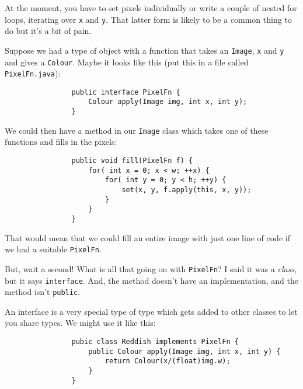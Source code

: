 \documentclass{article}
\begin{document}
            At the moment, you have to set pixels individually or write a couple of nested for loops, iterating over \texttt{x} and
            \texttt{y}.  That latter form is likely to be a common thing to do but it's a bit of pain.  
            
            Suppose we had a type of object with a function that takes an \texttt{Image}, \texttt{x} and \texttt{y} and gives a
            \texttt{Colour}. Maybe it looks like this (put this in a file called \texttt{PixelFn.java}):
        
            \begin{verbatim}
                public interface PixelFn {
                    Colour apply(Image img, int x, int y);
                }
            \end{verbatim}
            
            We could then have a method in our \texttt{Image} class which takes one of these functions and fills in the pixels:

            \begin{verbatim}
                public void fill(PixelFn f) {
                    for( int x = 0; x < w; ++x) {
                        for( int y = 0; y < h; ++y) {
                            set(x, y, f.apply(this, x, y));
                        }
                    }
                }
            \end{verbatim}
            
            That would mean that we could fill an entire image with just one line of code if we had a suitable \texttt{PixelFn}.
            
            But, wait a second! What is all that going on with \texttt{PixelFn}? I said it was a \emph{class}, but it says
            \texttt{interface}. And, the method doesn't have an implementation, and the method isn't \texttt{public}.
            
            An interface is a very special type of type which gets added to other classes to let you share types. We might use it like this:

            \begin{verbatim}
                pubic class Reddish implements PixelFn {
                    public Colour apply(Image img, int x, int y) {
                        return Colour(x/(float)img.w);
                    }
                }
            \end{verbatim}
            
\end{document}
